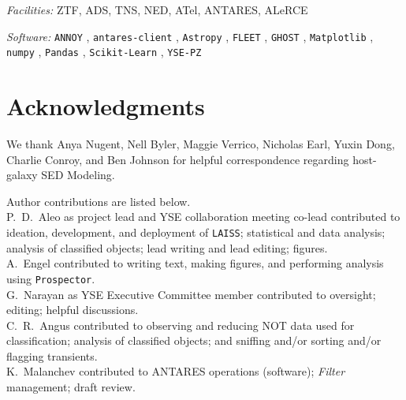 \documentclass[twocolumn]{aastex63}
\begin{document}

\textit{Facilities:} ZTF, ADS, TNS, NED, ATel, ANTARES, ALeRCE

\textit{Software:} \texttt{ANNOY} \citep{Github:annoy}, \texttt{antares-client} \citep{Gitlab:antares-client}, \texttt{Astropy} \citep{astropy:2013, astropy:2018}, \texttt{FLEET} \citep{Gomez2020}, \texttt{GHOST} \citep{Gagliano2021}, \texttt{Matplotlib} \citep{hunter2007matplotlib}, \texttt{numpy} \citep{walt2011_numpy}, \texttt{Pandas} \citep{reback2020_pandas}, \texttt{Scikit-Learn} \citep{scikit-learn}, \texttt{YSE-PZ} \citep{Coulter2022_YSEPZ, Coulter2023YSE-PZ}

\section{Acknowledgments} 
\label{sec:acknowledgments}

We thank Anya Nugent, Nell Byler, Maggie Verrico, Nicholas Earl, Yuxin Dong, Charlie Conroy, and Ben Johnson for helpful correspondence regarding host-galaxy SED Modeling.

Author contributions are listed below. \\
P.~D.~Aleo as project lead and YSE collaboration meeting co-lead contributed to ideation, development, and deployment of \texttt{LAISS}; statistical and data analysis; analysis of classified objects; lead writing and lead editing; figures. \\
A.~Engel contributed to writing text, making figures, and performing analysis using \texttt{Prospector}.\\
G.~Narayan as YSE Executive Committee member contributed to oversight; editing; helpful discussions.\\
C.~R.~Angus contributed to observing and reducing NOT data used for classification; analysis of classified objects; and sniffing and/or sorting and/or flagging transients.\\
K.~Malanchev contributed to ANTARES operations (software); \emph{Filter} management; draft review.\\
\end{document}
